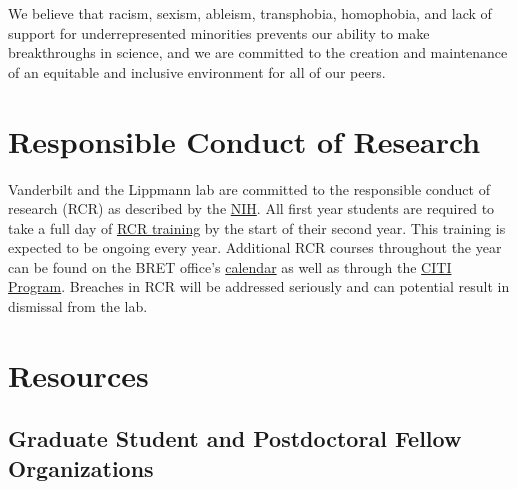 \documentclass[
]{book}
\begin{document}
We believe that racism, sexism, ableism, transphobia, homophobia, and lack of support for underrepresented minorities prevents our ability to make breakthroughs in science, and we are committed to the creation and maintenance of an equitable and inclusive environment for all of our peers.

\hypertarget{RCR}{%
\section{Responsible Conduct of Research}\label{RCR}}

Vanderbilt and the Lippmann lab are committed to the responsible conduct of research (RCR) as described by the \href{https://oir.nih.gov/sourcebook/ethical-conduct/responsible-conduct-research-training}{NIH}. All first year students are required to take a full day of \href{https://medschool.vanderbilt.edu/bret/responsible-conduct-research/}{RCR training} by the start of their second year. This training is expected to be ongoing every year. Additional RCR courses throughout the year can be found on the BRET office's \href{https://medschool.vanderbilt.edu/bret/seminar-series-calendar/}{calendar} as well as through the \href{https://about.citiprogram.org/en/series/responsible-conduct-of-research-rcr/}{CITI Program}. Breaches in RCR will be addressed seriously and can potential result in dismissal from the lab.

\hypertarget{resources}{%
\section{Resources}\label{resources}}

\hypertarget{graduate-student-and-postdoctoral-fellow-organizations}{%
\subsection{Graduate Student and Postdoctoral Fellow Organizations}\label{graduate-student-and-postdoctoral-fellow-organizations}}
\end{document}
